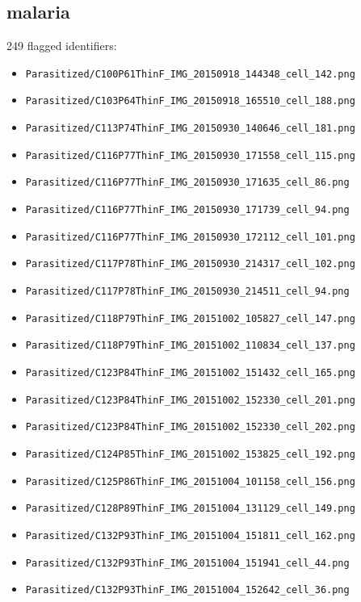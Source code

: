 \subsection*{malaria}
249 flagged identifiers:
\begin{itemize}
\item \texttt{Parasitized/C100P61ThinF\_IMG\_20150918\_144348\_cell\_142.png}
\item \texttt{Parasitized/C103P64ThinF\_IMG\_20150918\_165510\_cell\_188.png}
\item \texttt{Parasitized/C113P74ThinF\_IMG\_20150930\_140646\_cell\_181.png}
\item \texttt{Parasitized/C116P77ThinF\_IMG\_20150930\_171558\_cell\_115.png}
\item \texttt{Parasitized/C116P77ThinF\_IMG\_20150930\_171635\_cell\_86.png}
\item \texttt{Parasitized/C116P77ThinF\_IMG\_20150930\_171739\_cell\_94.png}
\item \texttt{Parasitized/C116P77ThinF\_IMG\_20150930\_172112\_cell\_101.png}
\item \texttt{Parasitized/C117P78ThinF\_IMG\_20150930\_214317\_cell\_102.png}
\item \texttt{Parasitized/C117P78ThinF\_IMG\_20150930\_214511\_cell\_94.png}
\item \texttt{Parasitized/C118P79ThinF\_IMG\_20151002\_105827\_cell\_147.png}
\item \texttt{Parasitized/C118P79ThinF\_IMG\_20151002\_110834\_cell\_137.png}
\item \texttt{Parasitized/C123P84ThinF\_IMG\_20151002\_151432\_cell\_165.png}
\item \texttt{Parasitized/C123P84ThinF\_IMG\_20151002\_152330\_cell\_201.png}
\item \texttt{Parasitized/C123P84ThinF\_IMG\_20151002\_152330\_cell\_202.png}
\item \texttt{Parasitized/C124P85ThinF\_IMG\_20151002\_153825\_cell\_192.png}
\item \texttt{Parasitized/C125P86ThinF\_IMG\_20151004\_101158\_cell\_156.png}
\item \texttt{Parasitized/C128P89ThinF\_IMG\_20151004\_131129\_cell\_149.png}
\item \texttt{Parasitized/C132P93ThinF\_IMG\_20151004\_151811\_cell\_162.png}
\item \texttt{Parasitized/C132P93ThinF\_IMG\_20151004\_151941\_cell\_44.png}
\item \texttt{Parasitized/C132P93ThinF\_IMG\_20151004\_152642\_cell\_36.png}

\end{itemize}
